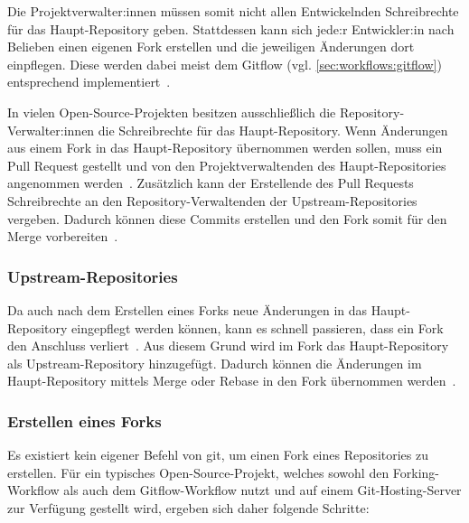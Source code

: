 Die Projektverwalter:innen müssen somit nicht allen Entwickelnden Schreibrechte für das Haupt\hyp Repository geben. Stattdessen kann sich jede:r Entwickler:in nach Belieben einen eigenen Fork erstellen und die jeweiligen Änderungen dort einpflegen. Diese werden dabei meist dem Gitflow (vgl. \autoref{sec:workflows:gitflow}) entsprechend implementiert~\cite{atlassianForkingWorkflow}.

In vielen Open\hyp Source\hyp Projekten besitzen ausschließlich die Repository\hyp Verwalter:innen die Schreibrechte für das Haupt\hyp Repository. Wenn Änderungen aus einem Fork in das Haupt\hyp Repository übernommen werden sollen, muss ein Pull Request gestellt und von den Projektverwaltenden des Haupt\hyp Repositories angenommen werden~\cite{gitHubInformationenZuForks}. Zusätzlich kann der Erstellende des Pull Requests Schreibrechte an den Repository\hyp Verwaltenden der Upstream\hyp Repositories vergeben. Dadurch können diese Commits erstellen und den Fork somit für den Merge vorbereiten~\cite{gitHubInformationenZuForks}.


\subsubsection{Upstream\hyp Repositories}

Da auch nach dem Erstellen eines Forks neue Änderungen in das Haupt\hyp Repository eingepflegt werden können, kann es schnell passieren, dass ein Fork den Anschluss verliert~\cite{atlassianForksAndUpstreams}. Aus diesem Grund wird im Fork das Haupt\hyp Repository als Upstream\hyp Repository hinzugefügt. Dadurch können die Änderungen im Haupt\hyp Repository mittels Merge oder Rebase in den Fork übernommen werden~\cite{atlassianForksAndUpstreams}.


\subsubsection{Erstellen eines Forks}

Es existiert kein eigener Befehl von git, um einen Fork eines Repositories zu erstellen. Für ein typisches Open\hyp Source\hyp Projekt, welches sowohl den Forking\hyp Workflow als auch dem Gitflow\hyp Workflow nutzt und auf einem Git\hyp Hosting\hyp Server zur Verfügung gestellt wird, ergeben sich daher folgende Schritte:

